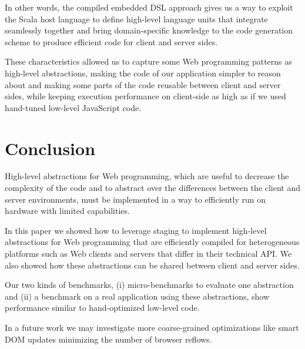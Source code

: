\documentclass[preprint]{sigplanconf}
\begin{document}
In other words, the compiled embedded DSL approach gives us a way to exploit the Scala host language
to define high-level language units that integrate seamlessly together and bring domain-specific
knowledge to the code generation scheme to produce efficient code for client and server sides.

These characteristics allowed us to capture some Web programming patterns as high-level
abstractions, making the code of our application simpler to reason about and making some parts of
the code reusable between client and server sides, while keeping execution performance on
client-side as high as if we used hand-tuned low-level JavaScript code.

\section{Conclusion}
\label{sec:conclusion}

High-level abstractions for Web programming, which are useful to decrease the complexity of the code
and to abstract over the differences between the client and server environments, must be implemented
in a way to efficiently run on hardware with limited capabilities.

In this paper we showed how to leverage staging to implement high-level abstractions for Web
programming that are efficiently compiled for heterogeneous platforms such as Web clients and
servers that differ in their technical API. We also showed how these abstractions can be shared
between client and server sides. 

Our two kinds of benchmarks, (i) micro-benchmarks to evaluate one abstraction and (ii) a benchmark
on a real application using these abstractions, show performance similar to hand-optimized
low-level code.

In a future work we may investigate more coarse-grained optimizations like smart DOM updates
minimizing the number of browser reflows.

%
%
%



%
%
%
\end{document}
